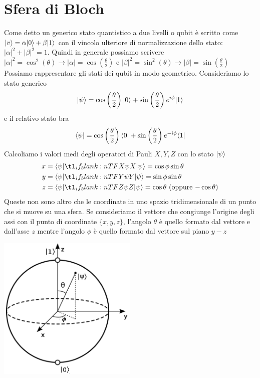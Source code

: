 \documentclass[12pt, a4paper]{report}
\begin{document}
\section{Sfera di Bloch}
Come detto un generico stato quantistico a due livelli o qubit è scritto come $| v \rangle=\alpha| 0 \rangle+\beta| 1 \rangle$ con il vincolo ulteriore di normalizzazione dello stato: $\lvert \alpha \rvert^{2} + \lvert \beta \rvert^{2} = 1$. Quindi in generale possiamo scrivere $\lvert \alpha \rvert^{2}=\cos^{2}\left(\theta\right) \rightarrow \lvert \alpha \rvert=\cos\left(\frac{\theta}{2}\right)$ e $\lvert \beta \rvert^{2}=\sin^{2}\left(\theta\right) \rightarrow \lvert \beta \rvert=\sin\left(\frac{\theta}{2}\right)$
Possiamo rappresentare gli stati dei qubit in modo geometrico. Consideriamo lo stato generico
\begin{equation*}
    | \psi \rangle = \cos\left(\frac{\theta}{2}\right)| 0 \rangle+\sin\left(\frac{\theta}{2}\right)e^{i\phi}| 1 \rangle
\end{equation*}
e il relativo stato bra
\begin{equation*}
    \langle \psi | = \cos\left(\frac{\theta}{2}\right)\langle 0 |+\sin\left(\frac{\theta}{2}\right)e^{-i\phi}\langle 1 |    
\end{equation*}
Calcoliamo i valori medi degli operatori di Pauli $X,Y,Z$ con lo stato $| \psi \rangle$
\begin{equation*}
    \begin{split}
        x &= \braket{\psi}[X]{\psi} = \cos \phi \sin \theta \\
        y &= \braket{\psi}[Y]{\psi} = \sin \phi \sin \theta \\
        z &= \braket{\psi}[Z]{\psi} = \cos \theta \text{ (oppure $-\cos \theta$)}
    \end{split}
\end{equation*}
Queste non sono altro che le coordinate in uno spazio tridimensionale di un punto che si muove su una sfera. Se consideriamo il vettore che congiunge l'origine degli assi con il punto di coordinate $\{x,y,z\}$, l'angolo $\theta$ è quello formato dal vettore e dall'asse $z$ mentre l'angolo $\phi$ è quello formato dal vettore sul piano $y-z$
\begin{center}
    \includegraphics[width=0.5\textwidth]{Immagini/sferadibloch.png}
\end{center}
\end{document}
